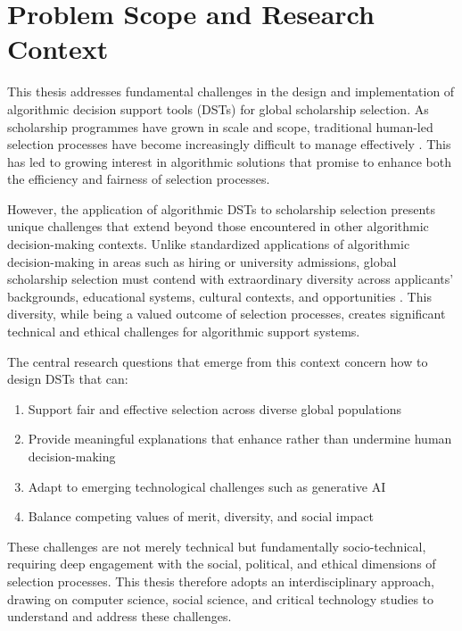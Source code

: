 \minitoc

\section{Problem Scope and Research Context}\label{sec:problem_scope}

This thesis addresses fundamental challenges in the design and implementation of algorithmic decision support tools (DSTs) for global scholarship selection. As scholarship programmes have grown in scale and scope, traditional human-led selection processes have become increasingly difficult to manage effectively \cite{Latzer_Hollnbuchner_Just_Saurwein_2014}. This has led to growing interest in algorithmic solutions that promise to enhance both the efficiency and fairness of selection processes.

However, the application of algorithmic DSTs to scholarship selection presents unique challenges that extend beyond those encountered in other algorithmic decision-making contexts. Unlike standardized applications of algorithmic decision-making in areas such as hiring or university admissions, global scholarship selection must contend with extraordinary diversity across applicants' backgrounds, educational systems, cultural contexts, and opportunities \cite{Warikoo_2019}. This diversity, while being a valued outcome of selection processes, creates significant technical and ethical challenges for algorithmic support systems.

The central research questions that emerge from this context concern how to design DSTs that can:
\begin{enumerate}
\item Support fair and effective selection across diverse global populations
\item Provide meaningful explanations that enhance rather than undermine human decision-making
\item Adapt to emerging technological challenges such as generative AI
\item Balance competing values of merit, diversity, and social impact
\end{enumerate}

These challenges are not merely technical but fundamentally socio-technical, requiring deep engagement with the social, political, and ethical dimensions of selection processes. This thesis therefore adopts an interdisciplinary approach, drawing on computer science, social science, and critical technology studies to understand and address these challenges.


